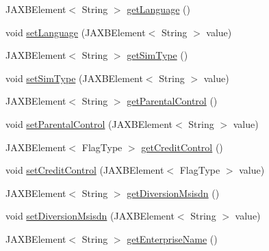 \begin{DoxyCompactItemize}
\item 
JAXBElement$<$ String $>$ \hyperlink{classcom_1_1telefonica_1_1schemas_1_1unica_1_1rest_1_1directory_1_1v1_1_1UserProfileType_afeff4b84edd4dcf4a5f74f1b2b43b153}{getLanguage} ()
\item 
void \hyperlink{classcom_1_1telefonica_1_1schemas_1_1unica_1_1rest_1_1directory_1_1v1_1_1UserProfileType_ae6aeb3f60f57fd379f4b0d1699505d17}{setLanguage} (JAXBElement$<$ String $>$ value)
\item 
JAXBElement$<$ String $>$ \hyperlink{classcom_1_1telefonica_1_1schemas_1_1unica_1_1rest_1_1directory_1_1v1_1_1UserProfileType_a1b0d3fd874768e9c05a73f548df8477c}{getSimType} ()
\item 
void \hyperlink{classcom_1_1telefonica_1_1schemas_1_1unica_1_1rest_1_1directory_1_1v1_1_1UserProfileType_a8304b81001e2f733c611451a86a7118b}{setSimType} (JAXBElement$<$ String $>$ value)
\item 
JAXBElement$<$ String $>$ \hyperlink{classcom_1_1telefonica_1_1schemas_1_1unica_1_1rest_1_1directory_1_1v1_1_1UserProfileType_a635b7fedb9f24d601773848013124014}{getParentalControl} ()
\item 
void \hyperlink{classcom_1_1telefonica_1_1schemas_1_1unica_1_1rest_1_1directory_1_1v1_1_1UserProfileType_a52f3f28fb3d6f8ab013e26e5502753e8}{setParentalControl} (JAXBElement$<$ String $>$ value)
\item 
JAXBElement$<$ FlagType $>$ \hyperlink{classcom_1_1telefonica_1_1schemas_1_1unica_1_1rest_1_1directory_1_1v1_1_1UserProfileType_a128382070d49c54df7ce2a0e48e29826}{getCreditControl} ()
\item 
void \hyperlink{classcom_1_1telefonica_1_1schemas_1_1unica_1_1rest_1_1directory_1_1v1_1_1UserProfileType_a36ce1310251584477e5b5273bf050b47}{setCreditControl} (JAXBElement$<$ FlagType $>$ value)
\item 
JAXBElement$<$ String $>$ \hyperlink{classcom_1_1telefonica_1_1schemas_1_1unica_1_1rest_1_1directory_1_1v1_1_1UserProfileType_ac6bb0841349063bc4de5cbf25e29fcb0}{getDiversionMsisdn} ()
\item 
void \hyperlink{classcom_1_1telefonica_1_1schemas_1_1unica_1_1rest_1_1directory_1_1v1_1_1UserProfileType_a80b28d5c59d1c7da0c1704c4dd72b486}{setDiversionMsisdn} (JAXBElement$<$ String $>$ value)
\item 
JAXBElement$<$ String $>$ \hyperlink{classcom_1_1telefonica_1_1schemas_1_1unica_1_1rest_1_1directory_1_1v1_1_1UserProfileType_aeec73e433a85480e3f567e5cfe4cae7e}{getEnterpriseName} ()
\item 

\end{DoxyCompactItemize}
